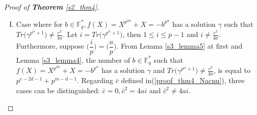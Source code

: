 \documentclass[final,1p,times]{elsarticle}
\begin{document}
\begin{proof}[Proof of \textbf{Theorem} \ref{s2_thm4}]
\begin{enumerate}[(I)]
\begin{itemize}
\item $ \bar{c}=4aTr\bigl(\gamma^{p^{\alpha}+1}\bigr)=c^{2} $, corresponding to the symbol $ 0,2c\pmod p $ whose exponents can be determined by Lemma \ref{Nac_md_even} and equal to $ p^{e-2} $.
\item $ \bar{c}\ne 4aTr\bigl(\gamma^{p^{\alpha}+1}\bigr)=c^{2} $, corresponding to the symbol $ (\bar{c}+c)\pmod p (\bar{c}\ne 0,\pm c)$ whose exponents can be determined by Lemma \ref{Nac_md_even} and equal to 
\begin{equation*}
p^{e-2}-p^{m+d-1}\widehat{\eta}\bigl(\bar{c}^{2}-4aTr(\gamma^{p^{\alpha}+1})\bigr)=
p^{e-2}-p^{m+d-1}\biggl(\dfrac{\bar{c}^{2}-c^{2}}{p}\biggr).
\end{equation*}
\end{itemize}
\textit{The contribution of this case} to the complete weight enumerator is obtained by gathering the above results:
\begin{equation}\label{proof_thm4_cwe03}
C_{3}=(p^{e-2d-1}+p^{m-d-1})w_{c}^{p^{e-2}-\bigl(\frac{-1}{p}\bigr)p^{m+d-1}}\prod_{\substack{1\leq i\leq p-1}}w_{i+c}^{p^{e-2}-\bigl(\frac{i^{2}-c^{2}}{p}\bigr)p^{m+d-1}}.
\end{equation}
We use Corollary \ref{sec3_Legendre_symbol_Lpc} to compute the Hamming weight of (\ref{proof_thm4_cwe03}).
\begin{equation}\label{proof_thm4_hamming_weight_c3}
\begin{split}
wt(C_{3})&=\biggl(p^{e-2}-\biggl(\frac{-1}{p}\biggr)p^{m+d-1}\biggr)+\sum_{i=1}^{p-1}\biggl(p^{e-2}-\biggl(\frac{i^{2}-c^{2}}{p}\biggr)p^{m+d-1}\biggr)-p^{e-2}\\
&=(p-1)p^{e-2}-\biggl(\biggl(\frac{-1}{p}\biggr)+L_{p}(c)\biggr)p^{m+d-1}\\
&=(p-1)p^{e-2}+p^{m+d-1}.
\end{split}
\end{equation}
Note that the multiplicity of $ wt(C_{3}) $ is $ A_{C_{3}}=  p^{e-2d-1}+p^{m-d-1}$. 
\item Case where for $ b\in \mathbb{F}_{q}^{*}, f(X)=X^{p^{2\alpha}} +X=- b^{p^{\alpha}} $ has a solution $ \gamma $ such that $ Tr\bigl(\gamma^{p^{\alpha}+1}\bigr)\ne \frac{c^{2}}{4a} $. Let $ i= Tr\bigl(\gamma^{p^{\alpha}+1}\bigr)$, then $ 1\leq i\leq p-1 $ and $ i\ne \frac{c^{2}}{4a} $. Furthermore, suppose $ \biggl(\dfrac{i}{p}\biggr)=\biggl(\dfrac{a}{p}\biggr) $. From Lemma \ref{s3_lemma5} at first and Lemma \ref{s3_lemma4}, the number of $ b\in \mathbb{F}_{q}^{*}$ such that $f(X)=X^{p^{2\alpha}} +X=- b^{p^{\alpha}} $ has a solution $ \gamma $ and $ Tr\bigl(\gamma^{p^{\alpha}+1}\bigr)\ne \frac{c^{2}}{4a} $, is equal to $ p^{e-2d-1}+p^{m-d-1} $. Regarding $ \bar{c} $ defined in(\ref{proof_thm4_Nacnu}), three cases can be distinguished: $ \bar{c}=0,\bar{c}^{2}=4ai $ and $ \bar{c}^{2}\ne 4ai $.

\end{enumerate}
\end{proof}
\end{document}
